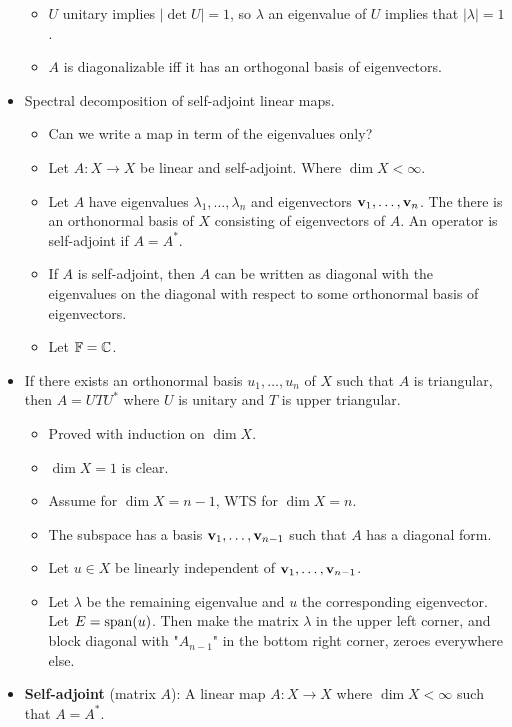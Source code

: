 \documentclass[../../notes.tex]{subfiles}
\begin{document}
\begin{itemize}
\begin{itemize}
        \item $U$ unitary implies $|\det U|=1$, so $\lambda$ an eigenvalue of $U$ implies that $|\lambda|=1$.
        \item $A$ is diagonalizable iff it has an orthogonal basis of eigenvectors.
    \end{itemize}
    \item {}Spectral decomposition of self-adjoint linear maps.
    \begin{itemize}
        \item Can we write a map in term of the eigenvalues only?
        \item Let $A:X\to X$ be linear and self-adjoint. Where $\dim X<\infty$.
        \item Let $A$ have eigenvalues $\lambda_1,\dots,\lambda_n$ and eigenvectors $\mathbf{v}_1,\dots,\mathbf{v}_n$. The there is an orthonormal basis of $X$ consisting of eigenvectors of $A$. An operator is self-adjoint if $A=A^*$.
        \item If $A$ is self-adjoint, then $A$ can be written as diagonal with the eigenvalues on the diagonal with respect to some orthonormal basis of eigenvectors.
        \item Let $\mathbb{F}=\mathbb{C}$.
    \end{itemize}
    \item If there exists an orthonormal basis $u_1,\dots,u_n$ of $X$ such that $A$ is triangular, then $A=UTU^*$ where $U$ is unitary and $T$ is upper triangular.
    \begin{itemize}
        \item Proved with induction on $\dim X$.
        \item $\dim X=1$ is clear.
        \item Assume for $\dim X=n-1$, WTS for $\dim X=n$.
        \item The subspace has a basis $\mathbf{v}_1,\dots,\mathbf{v}_{n-1}$ such that $A$ has a diagonal form.
        \item Let $u\in X$ be linearly independent of $\mathbf{v}_1,\dots,\mathbf{v}_{n-1}$.
        \item Let $\lambda$ be the remaining eigenvalue and $u$ the corresponding eigenvector. Let $E=\operatorname{span}(u)$. Then make the matrix $\lambda$ in the upper left corner, and block diagonal with "$A_{n-1}$" in the bottom right corner, zeroes everywhere else.
    \end{itemize}
    \item \textbf{Self-adjoint} (matrix $A$): A linear map $A:X\to X$ where $\dim X<\infty$ such that $A=A^*$.

\end{itemize}
\end{document}
